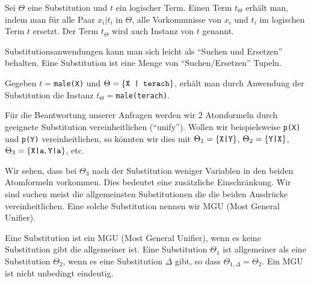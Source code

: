 \begin{defn}[Substitutionsanwendung]
Sei $\Theta$ eine Substitution und $t$ ein logischer Term. Einen Term
$t_{\Theta}$ erhält man, indem man für alle Paar $x_i | t_i$ in $\Theta$,
alle Vorkommnisse von $x_i$ und $t_i$ im logischen Term $t$ ersetzt.
Der Term $t_{\Theta}$ wird auch Instanz von $t$ genannt.
\end{defn}

Substitutionsanwendungen kann man sich leicht als ``Suchen und Ersetzen'' behalten.
Eine Substitution ist eine Menge von ``Suchen/Ersetzen'' Tupeln.

\begin{bsp}
Gegeben $t=$\verb|male(X)| und $\Theta=\left\{\texttt{X | terach}\right\}$,
 erhält man durch Anwendung der Substitution die Instanz $t_{\Theta}=$\verb|male(terach)|.
\end{bsp}

Für die Beantwortung unserer Anfragen werden wir 2 Atomformeln durch geeignete Substitution
vereinheitlichen (``unify''). Wollen wir beispielsweise \verb|p(X)| und \verb|p(Y)|
vereinheitlichen, so könnten wir dies mit $\Theta_1=\left\{\texttt{X|Y}\right\}$, $\Theta_2=\left\{\texttt{Y|X}\right\}$,
$\Theta_3=\left\{\texttt{X|a}, \texttt{Y|a}\right\}$, etc.

Wir sehen, dass bei $\Theta_3$ nach der Substitution weniger Variablen in den
beiden Atomformeln vorkommen. Dies bedeutet eine zusätzliche Einschränkung.
Wir sind suchen meist die allgemeinsten Substitutionen die die beiden Ausdrücke vereinheitlichen.
Eine solche Substitution nennen wir MGU (Most General Unifier).

\begin{defn}[MGU] Eine Substitution ist ein MGU (Most General Unifier), wenn es keine
Substitution gibt die allgemeiner ist.
Eine Substitution $\Theta_1$ ist allgemeiner als eine Substitution $\Theta_2$,
wenn es eine Substitution $\Delta$ gibt, so dass $\Theta_{1,\Delta}=\Theta_2$.
Ein MGU ist nicht unbedingt eindeutig.
\end{defn}


